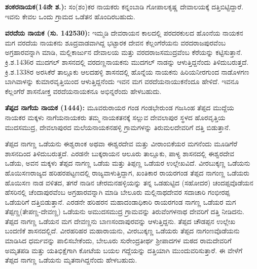 \textbf{ಶಂಕರನಾಯಕ(14ನೇ ಶ.):} ಸಂ(ಶಂ)ಕರ ನಾಯಕರು ಕನ್ನಂಬಾಡಿ ಗೋಪಾಲಕೃಷ್ಣ ದೇವಾಲಯಕ್ಕೆ ದತ್ತಿ\break ಬಿಟ್ಟಿದ್ದಾರೆ. ಇವನು ಕೇವಲ ಒಂದು ಗ್ರಾಮದ ಒಡೆತನ ಹೊಂದಿರಬಹುದು.

\newpage

\textbf{ವರದೆಯ ನಾಯಕ (ಸು. 1425\general{\enginline{-}}30):} ಇಮ್ಮಡಿ ದೇವರಾಯನ ಕಾಲದಲ್ಲಿ ಪರದರಕುಲದ ಹೊಂನೆಯ ನಾಯಕನ ಮಗ ವರದೆಯ ನಾಯಕನು ಶೂದ್ರವಾಡವಾಗಿದ್ದ ಭಟ್ಟಾರಕ ದೇವನ ಕೆಲ್ಲಂಗೆರೆಯನು ವರದರಾಜಪುರವೆಂಬ ಅಗ್ರಹಾರವನ್ನಾಗಿ ಮಾಡಿ, ಮಲ್ಲಿಕಾರ್ಜುನ ದೇವಾಲಯ ಮತ್ತು ವರದರಾಜಸಮುದ್ರವೆಂಬ ಕೆರೆಯನ್ನು ಕಟ್ಟಿಸುತ್ತಾನೆ. ಕ್ರಿ.ಶ.1436ರ ಮುದಗಲ್​ ಶಾಸನದಲ್ಲಿ ವರದಣ್ಣನಾಯಕನು ಮುದಗಲ್​ ನಾಡನ್ನು ಆಳುತ್ತಿದ್ದನೆಂದು ತಿಳಿದುಬರುತ್ತದೆ. ಕ್ರಿ.ಶ.1338ರ ಅರಸಿಕೆರೆ ತಾಲ್ಲೂಕು ಆಲದಹಳ್ಳಿ ಶಾಸನದಲ್ಲಿ ಹೊನ್ನೆಯ ನಾಯಕನು ಹಿರಿಯನೀರಗುಂದ ನಾಡೊಳಗಣ ಬಾಗಿವಾಳನ್ನು ಕುಮಾರವೃತ್ತಿಯಿಂದ ಆಳುತ್ತಿದ್ದನೆಂದು ಇವನ ಮಗ ವರದೆಯನಾಯುಕನೆಂದೂ ಹೇಳಿದೆ. ಇವನೂ ಕೆಲ್ಲಂಗೆರೆ ಶಾಸನೋಕ್ತ ವರದೆಯನಾಯಕನೂ ಅಭಿನ್ನರೆಂದು ಹೇಳಬಹುದು.

\textbf{ತೆಪ್ಪದ ನಾಗೆಯ ನಾಯಕ (1444): }ಮೂವರುರಾಯರ ಗಂಡ ಗಂಡಭೇರುಂಡ ಗಜಸಿಂಹ ತೆಪ್ಪದ ಮುದ್ದೆಯ ನಾಯಕರ ಮಕ್ಕಳು ನಾಗೆಯನಾಯಕರು ತಮ್ಮ ನಾಯಕತನಕ್ಕೆ ಸಲ್ಲುವ ದೇವಲಾಪುರ ಸ್ಥಳದ ಹೊರವೃತ್ತಿಯ ಮುದಸಮುದ್ರ, ದೇವಲಾಪುರದ ಮಲೆಯನಾಯಕನಹಳ್ಳಿ ಗ್ರಾಮಗಳನ್ನು ತಿರುಮಲದೇವರಿಗೆ ದತ್ತಿ ಬಿಡುತ್ತಾನೆ.

ತೆಪ್ಪದ ನಾಗಣ್ಣ ಒಡೆಯನು ಈಶ್ವರಾಂಕ ಅಥವಾ ಈಶ್ವರದೇವ ಮತ್ತು ವೀರಾಂಬಿಕೆಯರ ಮಗನೆಂದು ಮೂಡಿಗೆರೆ ಶಾಸನದಿಂದ ತಿಳಿದುಬರುತ್ತದೆ. ಎರಡನೇ ಬುಕ್ಕರಾಯನ ಆಲೂರು ತಾಲ್ಲೂಕು, ಪಾಳ್ಯ ಶಾಸನದಲ್ಲಿ ಈಶ್ವರದೇವ ಒಡೆಯ, ಅವನ ಮಕ್ಕಳು ತೆಪ್ಪದ ನಾಗಣ್ಣ ಒಡೆಯ ಮತ್ತು ತಿಪ್ಪಣ್ಣ ಒಡೆಯರ ಉಲ್ಲೇಖವಿದೆ. ವೀರಬುಕ್ಕಣ್ಣ ಒಡೆಯನು ಹೊಯಿಸಣರಾಜ್ಯದ ಹರಿಹರಪಟ್ಟಣದಲ್ಲಿ ರಾಜ್ಯವಾಳುತ್ತಿದ್ದಾಗ, ಖಂತಿಕಾರ ರಾಯರಗಂಡ ತೆಪ್ಪದ ನಾಗಂಣ್ಣ ಒಡೆಯರು ಹೊಯಿಸಣ ನಾಡ ವಳಿತದ, ತಗರೆ ನಾಡಿನ ಚೇರಮನಹಳ್ಳಿಯನ್ನು ತನ್ನ ಒಡಹುಟ್ಟಿದ (ಸಹೋದರ) ಚಂದಪ್ಪವೊಡೆಯನ ಹೆಸರಿನಲ್ಲಿ ಚೆಂದಾಪುರವೆಂಬ ಅಗ್ರಹಾರವನ್ನಾಗಿ ಮಾಡಿ ಬೇಲೂರು ಮಲ್ಲಿನಾಥದೇವರ ಸದಾಚಾರಿ ಗಂಭೀರಪ್ಪ ಒಡೆಯರಿಗೆ ದತ್ತಿಬಿಡುತ್ತಾನೆ. ಎರಡನೇ ಹರಿಹರನ ಮಹಾದಂಡಾಧಿಕಾರಿ ರಾಯರಗಂಡ ನಾಗಣ್ಣ ಒಡೆಯರ ಮಗ ತೆಪ್ಪಣ್ಣ(ತೇಪಣ್ಣ-\break ದೇವಣ್ಣ) ಒಡೆಯನು ಅಮುದಸಮುದ್ರ ಗ್ರಾಮವನ್ನು ತಿರುವೆಂಗಳನಾಥ ದೇವರಿಗೆ ದತ್ತಿ ನೀಡಿದನು. ತೆಪ್ಪದ ನಾಗಣ್ಣ ಒಡೆಯನ ಮಗ ದೇವಣ್ಣನು ಬಾಣಸಂದಾಪುರವನ್ನು ಆಳುತ್ತಿದ್ದನು. ತೆಪ್ಪದ ಚೌಡಪ್ಪನ ಉಲ್ಲೇಖ ಬಂದಣಿಕೆ ಶಾಸನದಲ್ಲಿದೆ. ವೀರಹರಿಹರ ಮಹಾರಾಯನು, ವೀರಬುಕ್ಕಣ್ಣ ಒಡೆಯರು ತೆಪ್ಪದ ನಾಗಂಣವೊಡೆಯನು ಮಾಡಿಸಿದ ಧರ್ಮವನ್ನು ಪಾಲಿಸ\-ಬೇಕೆಂದು, ಬೇಲೂರು ಸುರೇಂದ್ರತೀರ್ಥ ಶ‍್ರೀಪಾದಗಳ ಮಠದ ರಾಮದೇವರಿಗೆ ಅಮೃತಪಡಿ ಮತ್ತು ಯತಿಭಿಕ್ಷೆಗಾಗಿ ಕೋಟೆಯ ಬಯಲ ಗದ್ದೆಯನ್ನು ದತ್ತಿಯಾಗಿ ಮುಂದುವರಿಸುತ್ತಾರೆ. ಈ ವೇಳೆಗೆ ತೆಪ್ಪದ ನಾಗಣ್ಣ ಒಡೆಯನು ಮೃತನಾಗಿದ್ದನೆಂದು ಹೇಳಬಹುದು.

